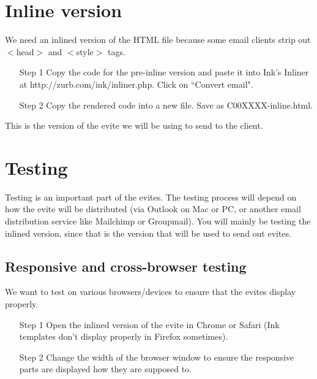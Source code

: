 \documentclass[a4paper,11pt]{article}
\begin{document}
	\section{Inline version}
	We need an inlined version of the HTML file because some email clients strip out $<$head$>$ and $<$style$>$ tags. 
	\begin{itemize}
		\item[Step 1] Copy the code for the pre-inline version and paste it into Ink's Inliner at http://zurb.com/ink/inliner.php. Click on ``Convert email".
		\item[Step 2] Copy the rendered code into a new file. Save as C00XXXX-inline.html.
	\end{itemize}
	This is the version of the evite we will be using to send to the client.
		
	\section{Testing}
	Testing is an important part of the evites. The testing process will depend on how the evite will be distributed (via Outlook on Mac or PC, or another email distribution service like Mailchimp or Groupmail). You will mainly be testing the inlined version, since that is the version that will be used to send out evites. 
	\subsection{Responsive and cross-browser testing}
	We want to test on various browsers/devices to ensure that the evites display properly.
	\begin{itemize}
		\item[Step 1] Open the inlined version of the evite in Chrome or Safari (Ink templates don't display properly in Firefox sometimes).
		\item[Step 2] Change the width of the browser window to ensure the responsive parts are displayed how they are supposed to.
	\end{itemize}
	
\end{document}
